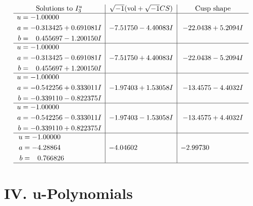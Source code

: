 \documentclass[1p]{elsarticle_modified}
\theoremstyle{definition}
\newcommand{\I}{\sqrt{-1}}
\begin{document}
$$\begin{array}{c|c|c}  
\text{Solutions to }I^u_{3}& \I (\text{vol} + \sqrt{-1}CS) & \text{Cusp shape}\\
 \hline 
\begin{aligned}
u &= -1.00000\phantom{ +0.000000I} \\
a &= -0.313425 + 0.691081 I \\
b &= \phantom{-}0.455697 - 1.200150 I\end{aligned}
 & -7.51750 - 4.40083 I & -22.0438 + 5.2094 I \\ \hline\begin{aligned}
u &= -1.00000\phantom{ +0.000000I} \\
a &= -0.313425 - 0.691081 I \\
b &= \phantom{-}0.455697 + 1.200150 I\end{aligned}
 & -7.51750 + 4.40083 I & -22.0438 - 5.2094 I \\ \hline\begin{aligned}
u &= -1.00000\phantom{ +0.000000I} \\
a &= -0.542256 + 0.333011 I \\
b &= -0.339110 - 0.822375 I\end{aligned}
 & -1.97403 + 1.53058 I & -13.4575 - 4.4032 I \\ \hline\begin{aligned}
u &= -1.00000\phantom{ +0.000000I} \\
a &= -0.542256 - 0.333011 I \\
b &= -0.339110 + 0.822375 I\end{aligned}
 & -1.97403 - 1.53058 I & -13.4575 + 4.4032 I \\ \hline\begin{aligned}
u &= -1.00000\phantom{ +0.000000I} \\
a &= -4.28864\phantom{ +0.000000I} \\
b &= \phantom{-}0.766826\phantom{ +0.000000I}\end{aligned}
 & -4.04602\phantom{ +0.000000I} & -2.99730\phantom{ +0.000000I}\\
 \hline 
 \end{array}$$\newpage
\newpage\renewcommand{\arraystretch}{1}
\centering \section*{ IV. u-Polynomials}
\end{document}

